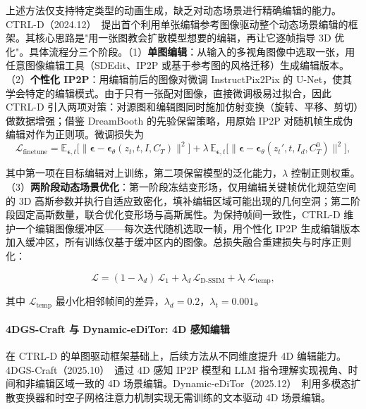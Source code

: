 上述方法仅支持特定类型的动画生成，缺乏对动态场景进行精确编辑的能力。CTRL-D（2024.12）~\cite{2412_01792}提出首个利用单张编辑参考图像驱动整个动态场景编辑的框架。其核心思路是"用一张图教会扩散模型想要的编辑，再让它逐帧指导 3D 优化"。具体流程分三个阶段。（1）\textbf{单图编辑}：从输入的多视角图像中选取一张，用任意图像编辑工具（SDEdit、IP2P 或基于参考图的风格迁移）生成编辑版本。（2）\textbf{个性化 IP2P}：用编辑前后的图像对微调 InstructPix2Pix 的 U-Net，使其学会特定的编辑模式。由于只有一张配对图像，直接微调极易过拟合，因此 CTRL-D 引入两项对策：对源图和编辑图同时施加仿射变换（旋转、平移、剪切）做数据增强；借鉴 DreamBooth 的先验保留策略，用原始 IP2P 对随机帧生成伪编辑对作为正则项。微调损失为
\begin{equation}
  \mathcal{L}_{\text{finetune}} = \mathbb{E}_{\boldsymbol{\epsilon}, t}\!\bigl[\|\boldsymbol{\epsilon} - \boldsymbol{\epsilon}_\theta(z_t, t, I, C_T)\|^2\bigr] + \lambda\,\mathbb{E}_{\boldsymbol{\epsilon}, t}\!\bigl[\|\boldsymbol{\epsilon} - \boldsymbol{\epsilon}_\theta(z_t', t, I_d, C_T^0)\|^2\bigr],
\end{equation}

其中第一项在目标编辑对上训练，第二项保留模型的泛化能力，$\lambda$ 控制正则权重。（3）\textbf{两阶段动态场景优化}：第一阶段冻结变形场，仅用编辑关键帧优化规范空间的 3D 高斯参数并执行自适应致密化，填补编辑区域可能出现的几何空洞；第二阶段固定高斯数量，联合优化变形场与高斯属性。为保持帧间一致性，CTRL-D 维护一个编辑图像缓冲区——每次迭代随机选取一帧，用个性化 IP2P 生成编辑版本加入缓冲区，所有训练仅基于缓冲区内的图像。总损失融合重建损失与时序正则化：

\begin{equation}
  \mathcal{L} = (1 - \lambda_d)\,\mathcal{L}_1 + \lambda_d\,\mathcal{L}_{\text{D-SSIM}} + \lambda_t\,\mathcal{L}_{\text{temp}},
\end{equation}

其中 $\mathcal{L}_{\text{temp}}$ 最小化相邻帧间的差异，$\lambda_d = 0.2$，$\lambda_t = 0.001$。

\paragraph{4DGS-Craft 与 Dynamic-eDiTor: 4D 感知编辑}

在 CTRL-D 的单图驱动框架基础上，后续方法从不同维度提升 4D 编辑能力。4DGS-Craft（2025.10）~\cite{2510_01991}通过 4D 感知 IP2P 模型和 LLM 指令理解实现视角、时间和非编辑区域一致的 4D 场景编辑。Dynamic-eDiTor（2025.12）~\cite{2512_00677}利用多模态扩散变换器和时空子网格注意力机制实现无需训练的文本驱动 4D 场景编辑。

